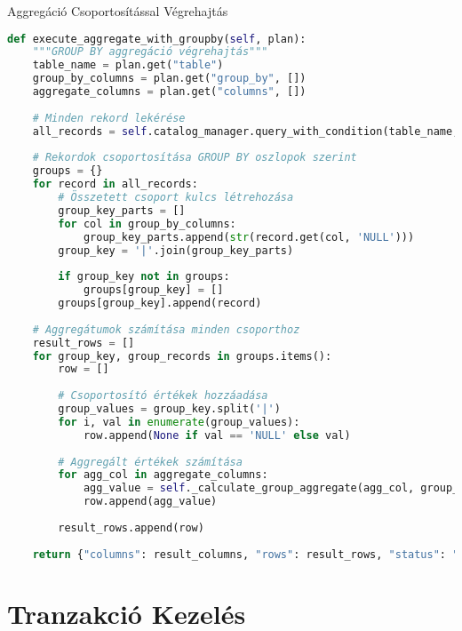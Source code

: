 \documentclass[aspectratio=169]{beamer}
\begin{document}
\begin{frame}[fragile]{Aggregáció Csoportosítással Végrehajtás}
\begin{lstlisting}[language=Python]
def execute_aggregate_with_groupby(self, plan):
    """GROUP BY aggregáció végrehajtás"""
    table_name = plan.get("table")
    group_by_columns = plan.get("group_by", [])
    aggregate_columns = plan.get("columns", [])
    
    # Minden rekord lekérése
    all_records = self.catalog_manager.query_with_condition(table_name, [], ["*"])
    
    # Rekordok csoportosítása GROUP BY oszlopok szerint
    groups = {}
    for record in all_records:
        # Összetett csoport kulcs létrehozása
        group_key_parts = []
        for col in group_by_columns:
            group_key_parts.append(str(record.get(col, 'NULL')))
        group_key = '|'.join(group_key_parts)
        
        if group_key not in groups:
            groups[group_key] = []
        groups[group_key].append(record)
    
    # Aggregátumok számítása minden csoporthoz
    result_rows = []
    for group_key, group_records in groups.items():
        row = []
        
        # Csoportosító értékek hozzáadása
        group_values = group_key.split('|')
        for i, val in enumerate(group_values):
            row.append(None if val == 'NULL' else val)
        
        # Aggregált értékek számítása
        for agg_col in aggregate_columns:
            agg_value = self._calculate_group_aggregate(agg_col, group_records)
            row.append(agg_value)
        
        result_rows.append(row)
    
    return {"columns": result_columns, "rows": result_rows, "status": "success"}
\end{lstlisting}
\end{frame}

\section{Tranzakció Kezelés}
\end{document}
